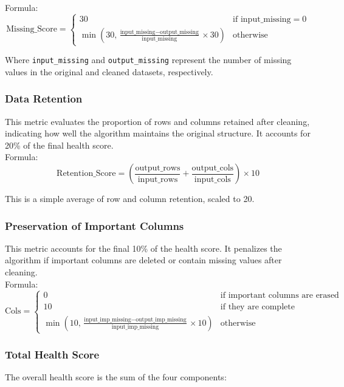 \documentclass[a4paper,12pt]{article}
\begin{document}
Formula:
\[
\text{Missing\_Score} =
\begin{cases}
30 & \text{if } \text{input\_missing} = 0 \\
\min\left(30, \frac{\text{input\_missing} - \text{output\_missing}}{\text{input\_missing}} \times 30 \right) & \text{otherwise}
\end{cases}
\]

Where \texttt{input\_missing} and \texttt{output\_missing} represent the number of missing values in the original and cleaned datasets, respectively.

\subsubsection{Data Retention}
This metric evaluates the proportion of rows and columns retained after cleaning, indicating how well the algorithm maintains the original structure. It accounts for 20\% of the final health score.\\

Formula:
\[
\text{Retention\_Score} = \left( \frac{\text{output\_rows}}{\text{input\_rows}} + \frac{\text{output\_cols}}{\text{input\_cols}} \right) \times 10
\]

This is a simple average of row and column retention, scaled to 20.

\subsubsection{Preservation of Important Columns}
This metric accounts for the final 10\% of the health score. It penalizes the algorithm if important columns are deleted or contain missing values after cleaning.\\

Formula:
\[
\text{Cols} =
\begin{cases}
0 & \text{if important columns are erased} \\
10 & \text{if they are complete} \\
\min\left(10, \frac{\text{input\_imp\_missing} - \text{output\_imp\_missing}}{\text{input\_imp\_missing}} \times 10 \right) & \text{otherwise}
\end{cases}
\]

\subsubsection{Total Health Score}
The overall health score is the sum of the four components:
\end{document}
